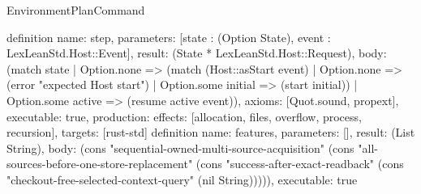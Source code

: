 \begin{lexlean}{EnvironmentPlanCommand}
\begin{semanticmodule}
{}
definition{
 name: step, parameters: [state : (Option State), event : LexLeanStd.Host::Event], result: (State * LexLeanStd.Host::Request),
 body: (match state | Option.none => (match (Host::asStart event) | Option.none => (error "expected Host start") | Option.some initial => (start initial)) | Option.some active => (resume active event)), axioms: [Quot.sound, propext], executable: true,
 production: {effects: [allocation, files, overflow, process, recursion], targets: [rust-std]}
}
definition{
 name: features, parameters: [], result: (List String),
 body: (cons "sequential-owned-multi-source-acquisition" (cons "all-sources-before-one-store-replacement" (cons "success-after-exact-readback" (cons "checkout-free-selected-context-query" (nil String))))), executable: true
}
\end{semanticmodule}
\end{lexlean}
